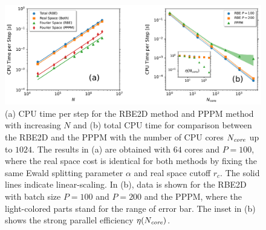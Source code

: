
\begin{figure}[ht!]
\centering	\includegraphics[width=0.9\linewidth]{figs/cpu_time_nonsub.pdf}
	\caption{
     (a) CPU time per step for the RBE2D method  {and PPPM method} with increasing $N$ and (b) total CPU time for comparison between the RBE2D and the PPPM with the number of CPU cores $N_{\emph{core}}$ up to $1024$.  {The results in (a) are obtained} with $64$ cores and $P=100$, where  {the real space cost is identical for both methods by fixing the same Ewald splitting parameter $\alpha$ and real space cutoff $r_c$.}
     The solid lines indicate linear-scaling. 
     In (b), data   {is} shown for the RBE2D with batch size $P=100$ and $P=200$ and the PPPM, where the light-colored parts stand for the range of error bar. The inset in (b) shows the   {strong parallel efficiency} $\eta(N_{\emph{core}})$.}
	\label{fig:Time}
\end{figure}

